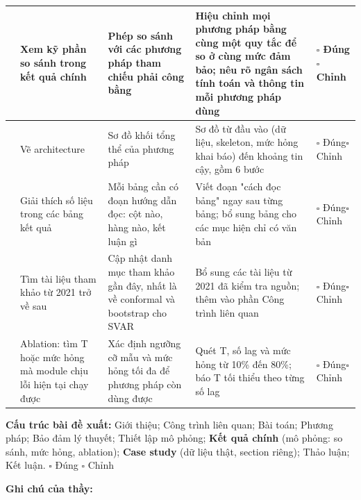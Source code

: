 \documentclass[9pt,landscape,a4paper]{extarticle}
\begin{document}
\begin{tabularx}{\textwidth}{|>{\centering\arraybackslash}p{0.5cm}|>{\raggedright\arraybackslash}p{4.6cm}|>{\raggedright\arraybackslash}p{5.2cm}|>{\raggedright\arraybackslash}X|>{\raggedright\arraybackslash}p{1.9cm}|}
6 & Xem kỹ phần so sánh trong kết quả chính & Phép so sánh với các phương pháp tham chiếu phải công bằng & Hiệu chỉnh mọi phương pháp bằng cùng một quy tắc để so ở cùng mức đảm bảo; nêu rõ ngân sách tính toán và thông tin mỗi phương pháp dùng & $\square$ Đúng\newline$\square$ Chỉnh \\ \hline
7 & Vẽ architecture & Sơ đồ khối tổng thể của phương pháp & Sơ đồ từ đầu vào (dữ liệu, skeleton, mức hỏng khai báo) đến khoảng tin cậy, gồm 6 bước & $\square$ Đúng\newline$\square$ Chỉnh \\ \hline
8 & Giải thích số liệu trong các bảng kết quả & Mỗi bảng cần có đoạn hướng dẫn đọc: cột nào, hàng nào, kết luận gì & Viết đoạn "cách đọc bảng" ngay sau từng bảng; bổ sung bảng cho các mục hiện chỉ có văn bản & $\square$ Đúng\newline$\square$ Chỉnh \\ \hline
9 & Tìm tài liệu tham khảo từ 2021 trở về sau & Cập nhật danh mục tham khảo gần đây, nhất là về conformal và bootstrap cho SVAR & Bổ sung các tài liệu từ 2021 đã kiểm tra nguồn; thêm vào phần Công trình liên quan & $\square$ Đúng\newline$\square$ Chỉnh \\ \hline
10 & Ablation: tìm T hoặc mức hỏng mà module chịu lỗi hiện tại chạy được & Xác định ngưỡng cỡ mẫu và mức hỏng tối đa để phương pháp còn dùng được & Quét T, số lag và mức hỏng từ 10\% đến 80\%; báo T tối thiểu theo từng số lag & $\square$ Đúng\newline$\square$ Chỉnh \\ \hline
\end{tabularx}
\vspace{4pt}

{\small \textbf{Cấu trúc bài đề xuất:} Giới thiệu; Công trình liên quan; Bài toán; Phương pháp; Bảo đảm lý thuyết; Thiết lập mô phỏng; \textbf{Kết quả chính} (mô phỏng: so sánh, mức hỏng, ablation); \textbf{Case study} (dữ liệu thật, section riêng); Thảo luận; Kết luận. \quad $\square$ Đúng \quad $\square$ Chỉnh}\par\vspace{6pt}
{\small \textbf{Ghi chú của thầy:} \rule{0pt}{0pt}\dotfill}
\end{document}
